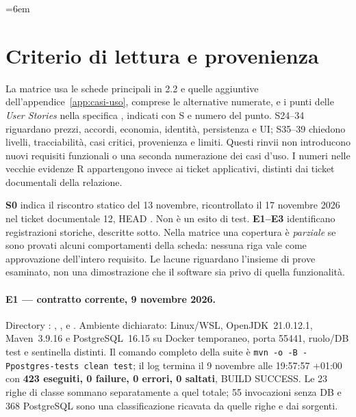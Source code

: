 \begingroup
\emergencystretch=6em
\def\UrlBreaks{\do\a\do\b\do\c\do\d\do\e\do\f\do\g\do\h\do\i\do\j\do\k\do\l\do\m\do\n\do\o\do\p\do\q\do\r\do\s\do\t\do\u\do\v\do\w\do\x\do\y\do\z\do\A\do\B\do\C\do\D\do\E\do\F\do\G\do\H\do\I\do\J\do\K\do\L\do\M\do\N\do\O\do\P\do\Q\do\R\do\S\do\T\do\U\do\V\do\W\do\X\do\Y\do\Z}
\setlength{\tabcolsep}{5pt}
\renewcommand{\arraystretch}{1.16}
\section{Criterio di lettura e provenienza}\label{sec:matrice-provenienza}
La matrice usa le schede principali in 2.2 e quelle aggiuntive
dell'appendice~\ref{app:casi-uso}, comprese le
alternative numerate, e i punti delle \emph{User Stories} nella specifica
, indicati con S e numero del punto.
S24--34 riguardano prezzi, accordi, economia, identità, persistenza e UI;
S35--39 chiedono livelli, tracciabilità, casi critici, provenienza e limiti.
Questi rinvii non introducono nuovi requisiti funzionali o una seconda
numerazione dei casi d'uso. I numeri nelle vecchie evidenze R appartengono
invece ai ticket applicativi, distinti dai ticket documentali della relazione.

\textbf{S0} indica il riscontro statico del 13 novembre, ricontrollato il 17 novembre 2026 nel ticket documentale 12, HEAD
. Non è un esito di test.
\textbf{E1--E3} identificano registrazioni storiche, descritte sotto.
Nella matrice una copertura è \emph{parziale} se sono provati alcuni
comportamenti della scheda: nessuna riga vale come approvazione dell'intero
requisito. Le lacune riguardano l'insieme di prove esaminato, non una
dimostrazione che il software sia privo di quella funzionalità.

\paragraph{E1 --- contratto corrente, 9 novembre 2026.}
Directory :
, , 
e . Ambiente dichiarato: Linux/WSL, OpenJDK~21.0.12.1,
Maven~3.9.16 e PostgreSQL~16.15 su Docker temporaneo, porta 55441,
ruolo/DB test e sentinella distinti. Il comando completo della suite è
\texttt{mvn -o -B -Ppostgres-tests clean test}; il log termina il
9 novembre alle 19:57:57 +01:00 con \textbf{423 eseguiti, 0 failure,
0 errori, 0 saltati}, BUILD SUCCESS. Le 23 righe di classe sommano
separatamente a quel totale; 55 invocazioni senza DB e 368 PostgreSQL
sono una classificazione ricavata da quelle righe e dai sorgenti.

